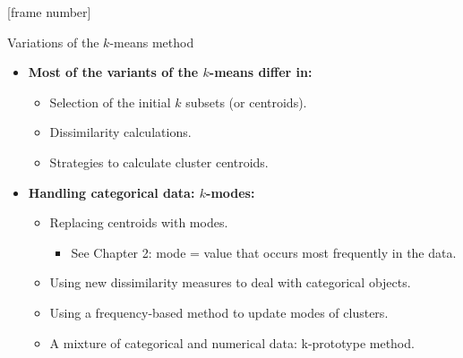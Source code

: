 \documentclass[aspectratio=169,t,xcolor=dvipsnames]{beamer}
\begin{document}
  {
    [frame number]
    \begin{frame}{Variations of the $k$-means method}
      \begin{itemize}
        \item \textbf{Most of the variants of the $k$-means differ in:}
        \begin{itemize}
          \item Selection of the initial $k$ subsets (or centroids).
          \item Dissimilarity calculations.
          \item Strategies to calculate cluster centroids.
        \end{itemize}
        \item \textbf{Handling categorical data: $k$-modes:}
        \begin{itemize}
          \item Replacing centroids with modes.
          \begin{itemize}
            \item See Chapter 2: mode = value that occurs most frequently in the data.
          \end{itemize}
          \item Using new dissimilarity measures to deal with categorical objects.
          \item Using a frequency-based method to update modes of clusters.
          \item A mixture of categorical and numerical data: k-prototype method.
        \end{itemize}
      \end{itemize}
    \end{frame}
  }
\end{document}
